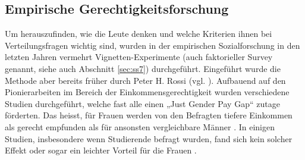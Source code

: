 \documentclass[a4paper,12pt]{article}
\renewcommand{\baselinestretch}{1.1}
\newif\ifcomments
\newcommand{\comment}[1]{%
    \ifcomments\marginpar{\renewcommand{\baselinestretch}{1}\tiny\hspace*{-1.1em}\colorbox{gray!20}%
    {\textcolor{red}{\parbox[t]{.9in}{\raggedright #1}}}}\fi}
\begin{document}
\subsection{Empirische Gerechtigkeitsforschung}
\label{sec:ss4}

Um herauszufinden, wie die Leute denken und welche Kriterien ihnen bei
Verteilungsfragen wichtig sind, wurden in der empirischen Sozialforschung in
den letzten Jahren vermehrt Vignetten-Experimente (auch faktorieller Survey
genannt, siehe auch Abschnitt \ref{sec:ss7}) durchgeführt. Eingeführt wurde die Methode aber bereits früher durch
Peter H. Rossi (vgl. \citealp{Rossi-1979,Rossi-Nock-1982}). Aufbauend auf den
Pionierarbeiten im Bereich der Einkommensgerechtigkeit
\citep{Jasso-1980,Jasso-Rossi-1977,Jasso-Webster-1997} wurden verschiedene
Studien durchgeführt, welche fast alle einen „Just Gender Pay Gap“ zutage förderten. Das heisst, für Frauen werden von den Befragten tiefere Einkommen als gerecht empfunden als für ansonsten vergleichbare Männer \citep{Jasso-Webster-1997,Jann-2003,Gatskova-2015,Sauer-etal-2009}. In einigen Studien, insbesondere wenn Studierende befragt wurden, fand sich kein solcher Effekt \citep{Auspurg-2009} oder sogar ein leichter Vorteil für die Frauen \citep{Jasso-Webster-1999}. 
\comment{einzelne Experimente ev. noch etwas ausführlicher diskutieren -> ok}
\end{document}
